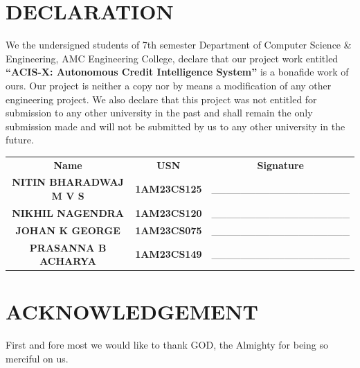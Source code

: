 \documentclass[a4paper, 12pt]{report}
\begin{document}
\chapter*{DECLARATION}
\thispagestyle{borderedpage}

\doublespacing

We the undersigned students of 7th semester Department of Computer Science \& Engineering, AMC Engineering College, declare that our project work entitled \textbf{``ACIS-X: Autonomous Credit Intelligence System''} is a bonafide work of ours. Our project is neither a copy nor by means a modification of any other engineering project. We also declare that this project was not entitled for submission to any other university in the past and shall remain the only submission made and will not be submitted by us to any other university in the future.\\

\vspace{1.5cm}
\begin{table}[H]
    \centering
    \renewcommand{\arraystretch}{1.3}
    \setlength{\tabcolsep}{20pt} %
    \begin{tabular}{ccc}
        \textbf{Name} & \textbf{USN} & \textbf{Signature} \\[0.5cm]
        \textbf{NITIN BHARADWAJ M V S} & \textbf{1AM23CS125} & \_\_\_\_\_\_\_\_\_\_\_\_\_\_\_\_\_\_\_ \\
        \textbf{NIKHIL NAGENDRA} & \textbf{1AM23CS120} & \_\_\_\_\_\_\_\_\_\_\_\_\_\_\_\_\_\_\_ \\
        \textbf{JOHAN K GEORGE} & \textbf{1AM23CS075} & \_\_\_\_\_\_\_\_\_\_\_\_\_\_\_\_\_\_\_ \\
        \textbf{PRASANNA B ACHARYA} & \textbf{1AM23CS149} & \_\_\_\_\_\_\_\_\_\_\_\_\_\_\_\_\_\_\_ \\
    \end{tabular}
\end{table}

\pagebreak

\chapter*{ACKNOWLEDGEMENT}
\thispagestyle{borderedpage}

\doublespacing

First and fore most we would like to thank GOD, the Almighty for being so merciful on us.
\end{document}
